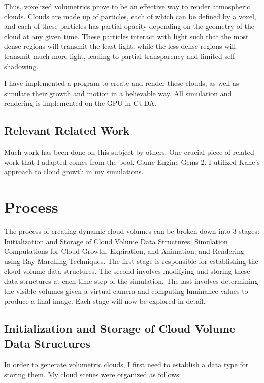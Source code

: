\documentclass{jcgt}
\begin{document}
Thus, voxelized volumetrics prove to be an effective way to render
atmospheric clouds. Clouds are made up of particles, each of which can be defined
by a voxel, and each of these particles has partial opacity depending on
the geometry of the cloud at any given time. These particles 
interact with light such that the most dense regions will transmit the least light,
while the less dense regions will transmit much more light, leading to partial 
transparency and limited self-shadowing.

I have implemented a program to create and render these clouds, as well as simulate 
their growth and motion in a believable way. All simulation and rendering is 
implemented on the GPU in CUDA.

\subsection{Relevant Related Work}
\label{sec:relatedwork}

Much work has been done on this subject by others. One crucial piece of related 
work that I adapted comes from the book Game Engine Gems 2. I utilized Kane's 
approach to cloud growth in my simulations.

\section{Process}
The process of creating dynamic cloud volumes can be broken down into 3 stages: 
Initialization and Storage of Cloud Volume Data Structures; Simulation Computations
for Cloud Growth, Expiration, and Animation; and Rendering using Ray Marching Techniques. 
The first stage is responsible for establishing the cloud volume data structures. The second 
involves modifying and storing these data structures at each time-step of the simulation. 
The last involves determining the visible volumes given a virtual camera and computing 
luminance values to produce a final image. Each stage will now be explored in detail.

\subsection{Initialization and Storage of Cloud Volume Data Structures}
In order to generate volumetric clouds, I first need to establish a data type for storing
them. My cloud scenes were organized as follows:
\end{document}
